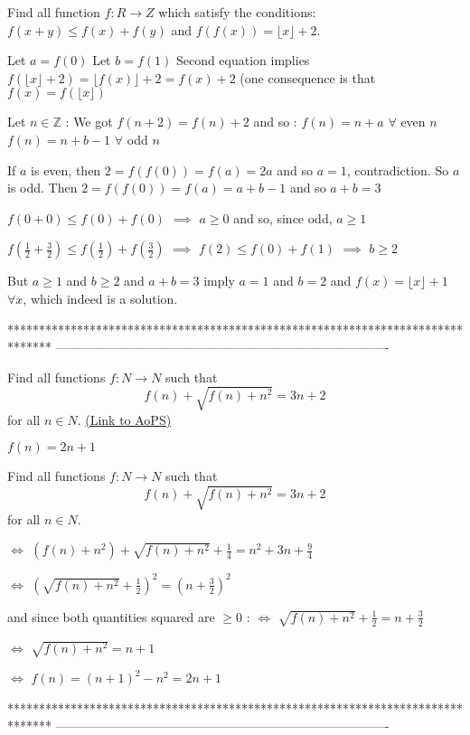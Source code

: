 \begin{solution}
	\begin{tcolorbox}Find all function  $f:R\rightarrow Z$  which satisfy the conditions:
$ f(x+y)\le f(x)+f(y) $ and
$ f(f(x))=\lfloor x \rfloor +2$.\end{tcolorbox}
Let $a=f(0)$
Let $b=f(1)$
Second equation implies $f(\lfloor x\rfloor+2)=\lfloor f(x)\rfloor+2=f(x)+2$ (one consequence is that $f(x)=f(\lfloor x\rfloor)$

Let $n\in\mathbb Z$ : We got $f(n+2)=f(n)+2$ and so :
$f(n)=n+a$ $\forall $ even $n$
$f(n)=n+b-1$ $\forall $ odd $n$

If $a$ is even, then $2=f(f(0))=f(a)=2a$ and so $a=1$, contradiction. So $a$ is odd. Then $2=f(f(0))=f(a)=a+b-1$ and so $a+b=3$

$f(0+0)\le f(0)+f(0)$ $\implies$ $a\ge 0$ and so, since odd, $a\ge 1$

$f(\frac 12+\frac 32)\le f(\frac 12)+f(\frac 32)$ $\implies$ $f(2)\le f(0)+f(1)$ $\implies$ $b\ge 2$

But $a\ge 1$ and $b\ge 2$ and $a+b=3$ imply $a=1$ and $b=2$ and $\boxed{f(x)=\lfloor x\rfloor+1}$ $\forall x$, which indeed is a solution.
\end{solution}
*******************************************************************************
-------------------------------------------------------------------------------

\begin{problem}
	Find all functions  $f:N\rightarrow N$ such that  \[ f(n)+\sqrt{f(n)+n^2}=3n+2 \] for all $n\in N$.
	\flushright \href{https://artofproblemsolving.com/community/c6h537477}{(Link to AoPS)}
\end{problem}



\begin{solution}
	$f(n)=2n+1$
\end{solution}



\begin{solution}
	\begin{tcolorbox}Find all functions  $f:N\rightarrow N$ such that  \[ f(n)+\sqrt{f(n)+n^2}=3n+2 \] for all $n\in N$.\end{tcolorbox}
$\iff$ $(f(n)+n^2)+\sqrt{f(n)+n^2}+\frac 14=n^2+3n+\frac 94$

$\iff$ $(\sqrt{f(n)+n^2}+\frac 12)^2=(n+\frac 32)^2$

and since both quantities squared are $\ge 0$ : $\iff$ $\sqrt{f(n)+n^2}+\frac 12=n+\frac 32$

$\iff$ $\sqrt{f(n)+n^2}=n+1$

$\iff$ $f(n)=(n+1)^2-n^2=2n+1$
\end{solution}
*******************************************************************************
-------------------------------------------------------------------------------

